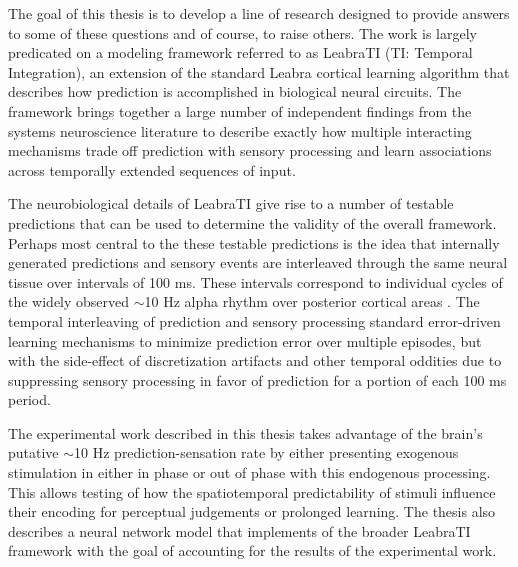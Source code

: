 \documentclass[dwyatte_dissertation.tex]{subfiles}
\begin{document}
{The goal of this thesis is to develop a line of research designed to provide answers to some of these questions and of course, to raise others. The work is largely predicated on a modeling framework referred to as LeabraTI (TI: Temporal Integration), an extension of the standard Leabra cortical learning algorithm \cite{OReillyMunakata00,OReillyMunakataFrankEtAl12} that describes how prediction is accomplished in biological neural circuits. The framework brings together a large number of independent findings from the systems neuroscience literature to describe exactly how multiple interacting mechanisms trade off prediction with sensory processing and learn associations across temporally extended sequences of input. 

The neurobiological details of LeabraTI give rise to a number of testable predictions that can be used to determine the validity of the overall framework. Perhaps most central to the these testable predictions is the idea that internally generated predictions and sensory events are interleaved through the same neural tissue over intervals of 100 ms. These intervals correspond to individual cycles of the widely observed $\sim$10 Hz alpha rhythm over posterior cortical areas \cite{PalvaPalva07,HanslmayrGrossKlimeschEtAl11,VanRullenBuschDrewesEtAl11}. The temporal interleaving of prediction and sensory processing standard error-driven learning mechanisms to minimize prediction error over multiple episodes, but with the side-effect of discretization artifacts and other temporal oddities due to suppressing sensory processing in favor of prediction for a portion of each 100 ms period.

The experimental work described in this thesis takes advantage of the brain's putative $\sim$10 Hz prediction-sensation rate by either presenting exogenous stimulation in either in phase or out of phase with this endogenous processing. This allows testing of how the spatiotemporal predictability of stimuli influence their encoding for perceptual judgements or prolonged learning. The thesis also describes a neural network model that implements of the broader LeabraTI framework with the goal of accounting for the results of the experimental work.

}
\end{document}
